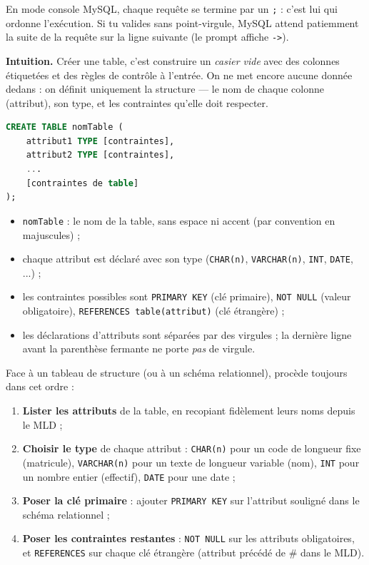 \documentclass[11pt]{article}
\newcommand{\cle}[1]{{\popxbold\color{popdark}#1}}
\newcounter{popsec}
\newcounter{popsub}
\newcommand{\courssub}[1]{%
  \stepcounter{popsub}%
  \par\vspace{9pt}\noindent{\popxbold\fontsize{11.5}{13}\selectfont\color{popink}{\color{poporange}\thepopsec.\thepopsub}\hspace{6pt}#1}\par\nopagebreak\vspace{4pt}
}
\begin{document}
\begin{attention}
En mode console MySQL, chaque requête se termine par un \texttt{;} : c'est lui qui ordonne l'exécution. Si tu valides sans point-virgule, MySQL attend patiemment la suite de la requête sur la ligne suivante (le prompt affiche \texttt{->}).
\end{attention}

\courssub{Création d'une table : CREATE TABLE}

\textbf{Intuition.} Créer une table, c'est construire un \emph{casier vide} avec des colonnes étiquetées et des règles de contrôle à l'entrée. On ne met encore aucune donnée dedans : on définit uniquement la \cle{structure} — le nom de chaque colonne (attribut), son type, et les contraintes qu'elle doit respecter.

\begin{propriete}
\begin{lstlisting}[language=SQL]
CREATE TABLE nomTable (
    attribut1 TYPE [contraintes],
    attribut2 TYPE [contraintes],
    ...
    [contraintes de table]
);
\end{lstlisting}
\begin{itemize}
\item \texttt{nomTable} : le nom de la table, sans espace ni accent (par convention en majuscules) ;
\item chaque attribut est déclaré avec son \cle{type} (\texttt{CHAR(n)}, \texttt{VARCHAR(n)}, \texttt{INT}, \texttt{DATE}, ...) ;
\item les contraintes possibles sont \texttt{PRIMARY KEY} (clé primaire), \texttt{NOT NULL} (valeur obligatoire), \texttt{REFERENCES table(attribut)} (clé étrangère) ;
\item les déclarations d'attributs sont séparées par des virgules ; la dernière ligne avant la parenthèse fermante ne porte \emph{pas} de virgule.
\end{itemize}
\end{propriete}

\begin{methode}
Face à un tableau de structure (ou à un schéma relationnel), procède toujours dans cet ordre :
\begin{enumerate}
\item \textbf{Lister les attributs} de la table, en recopiant fidèlement leurs noms depuis le MLD ;
\item \textbf{Choisir le type} de chaque attribut : \texttt{CHAR(n)} pour un code de longueur fixe (matricule), \texttt{VARCHAR(n)} pour un texte de longueur variable (nom), \texttt{INT} pour un nombre entier (effectif), \texttt{DATE} pour une date ;
\item \textbf{Poser la clé primaire} : ajouter \texttt{PRIMARY KEY} sur l'attribut souligné dans le schéma relationnel ;
\item \textbf{Poser les contraintes restantes} : \texttt{NOT NULL} sur les attributs obligatoires, et \texttt{REFERENCES} sur chaque clé étrangère (attribut précédé de \# dans le MLD).
\end{enumerate}
\end{methode}
\end{document}
